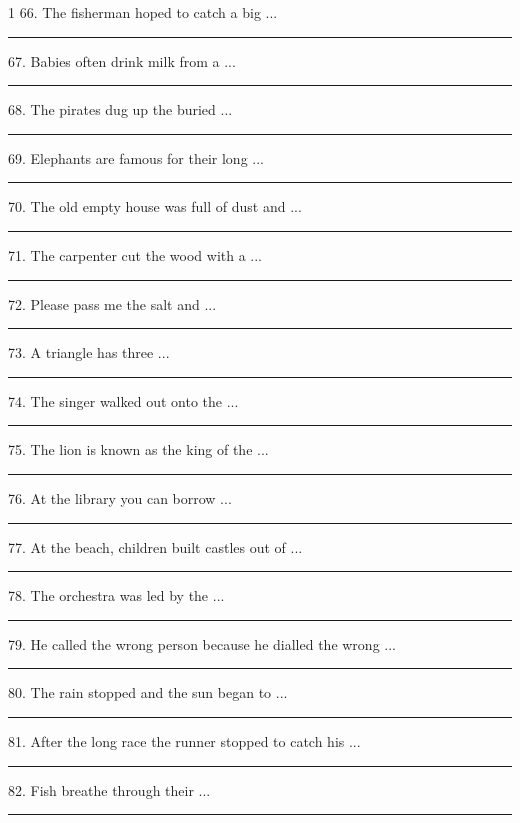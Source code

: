 \documentclass[11pt,a4paper]{article}
\newcommand{\blank}[1][1.2cm]{\rule{#1}{0.4pt}}
\begin{document}
\begin{multicols}{1}
66. The fisherman hoped to catch a big ...\hfill\blank[3cm]\par\vspace{3pt}
67. Babies often drink milk from a ...\hfill\blank[3cm]\par\vspace{3pt}
68. The pirates dug up the buried ...\hfill\blank[3cm]\par\vspace{3pt}
69. Elephants are famous for their long ...\hfill\blank[3cm]\par\vspace{3pt}
70. The old empty house was full of dust and ...\hfill\blank[3cm]\par\vspace{3pt}
71. The carpenter cut the wood with a ...\hfill\blank[3cm]\par\vspace{3pt}
72. Please pass me the salt and ...\hfill\blank[3cm]\par\vspace{3pt}
73. A triangle has three ...\hfill\blank[3cm]\par\vspace{3pt}
74. The singer walked out onto the ...\hfill\blank[3cm]\par\vspace{3pt}
75. The lion is known as the king of the ...\hfill\blank[3cm]\par\vspace{3pt}
76. At the library you can borrow ...\hfill\blank[3cm]\par\vspace{3pt}
77. At the beach, children built castles out of ...\hfill\blank[3cm]\par\vspace{3pt}
78. The orchestra was led by the ...\hfill\blank[3cm]\par\vspace{3pt}
79. He called the wrong person because he dialled the wrong ...\hfill\blank[3cm]\par\vspace{3pt}
80. The rain stopped and the sun began to ...\hfill\blank[3cm]\par\vspace{3pt}
81. After the long race the runner stopped to catch his ...\hfill\blank[3cm]\par\vspace{3pt}
82. Fish breathe through their ...\hfill\blank[3cm]\par\vspace{3pt}

\end{multicols}
\end{document}

